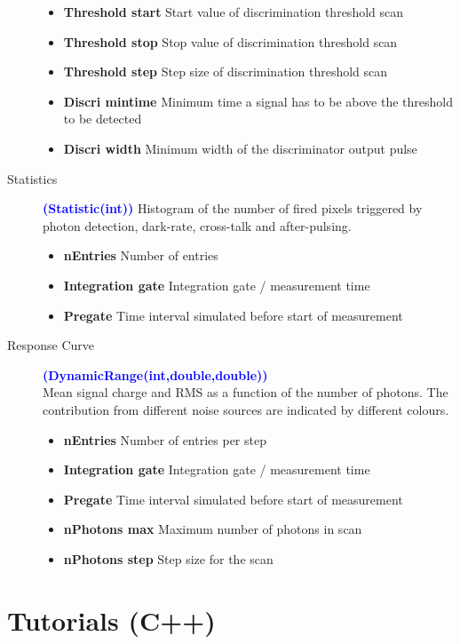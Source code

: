 \begin{description}
\begin{itemize}
		\item \textbf{Threshold start} Start value of discrimination threshold scan
		\item \textbf{Threshold stop} Stop value of discrimination threshold scan
		\item \textbf{Threshold step} Step size of discrimination threshold scan
		\item \textbf{Discri mintime} Minimum time a signal has to be above the threshold to be detected
		\item \textbf{Discri width} Minimum width of the discriminator output pulse
	\end{itemize}
	\item[Statistics] \textcolor{blue}{\textbf{(Statistic(int))}}
		Histogram of the number of fired pixels triggered by photon detection, dark-rate, cross-talk and after-pulsing.
	\begin{itemize}
		\item \textbf{nEntries} Number of entries
		\item \textbf{Integration gate} Integration gate / measurement time
		\item \textbf{Pregate} Time interval simulated before start of measurement
	\end{itemize}
	\item[Response Curve] \textcolor{blue}{\textbf{(DynamicRange(int,double,double))}}\\
		Mean signal charge and RMS as a function of the number of photons. The contribution from different noise sources are indicated by different colours.
	\begin{itemize}
		\item \textbf{nEntries} Number of entries per step
		\item \textbf{Integration gate} Integration gate / measurement time
		\item \textbf{Pregate} Time interval simulated before start of measurement
		\item \textbf{nPhotons max} Maximum number of photons in scan
		\item \textbf{nPhotons step} Step size for the scan
	\end{itemize}
\end{description}



\chapter{Tutorials (C++)}

